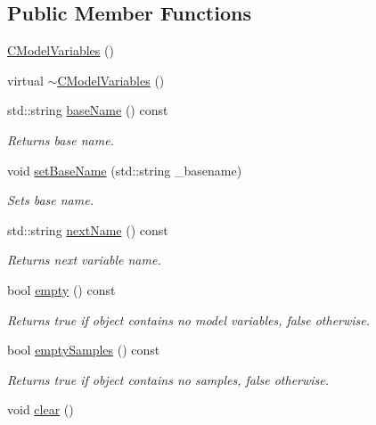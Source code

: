 \subsection*{Public Member Functions}
\begin{DoxyCompactItemize}
\item 
\hyperlink{class_go_s_u_m_1_1_c_model_variables_a539072552d0e09d02843a1fa44b11d3b}{C\-Model\-Variables} ()
\item 
virtual \hyperlink{class_go_s_u_m_1_1_c_model_variables_a441352009e92c8d767e798d41e9c19ea}{$\sim$\-C\-Model\-Variables} ()
\item 
std\-::string \hyperlink{class_go_s_u_m_1_1_c_model_variables_a9351f5510881471981abd458b4ca4488}{base\-Name} () const 
\begin{DoxyCompactList}\small\item\em Returns base name. \end{DoxyCompactList}\item 
void \hyperlink{class_go_s_u_m_1_1_c_model_variables_a11a9ee018a817a9d6ce0914e6bed0b91}{set\-Base\-Name} (std\-::string \-\_\-basename)
\begin{DoxyCompactList}\small\item\em Sets base name. \end{DoxyCompactList}\item 
std\-::string \hyperlink{class_go_s_u_m_1_1_c_model_variables_af11771a78369e73163d30e13e6e90c2f}{next\-Name} () const 
\begin{DoxyCompactList}\small\item\em Returns next variable name. \end{DoxyCompactList}\item 
bool \hyperlink{class_go_s_u_m_1_1_c_model_variables_a89540611f83890ddefa97505ef2c02de}{empty} () const 
\begin{DoxyCompactList}\small\item\em Returns true if object contains no model variables, false otherwise. \end{DoxyCompactList}\item 
bool \hyperlink{class_go_s_u_m_1_1_c_model_variables_aed850606b33ac1a1d04293eb49ea34fa}{empty\-Samples} () const 
\begin{DoxyCompactList}\small\item\em Returns true if object contains no samples, false otherwise. \end{DoxyCompactList}\item 
void \hyperlink{class_go_s_u_m_1_1_c_model_variables_aae62db449aed7eaeb8eefb0143e5de2c}{clear} ()

\end{DoxyCompactItemize}
